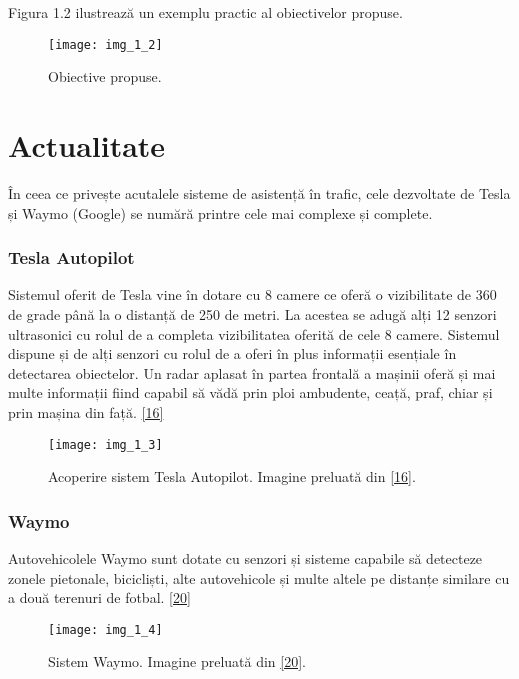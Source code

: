Figura 1.2 ilustrează un exemplu practic al obiectivelor propuse.
\begin{figure}[!h]
	\centering
	\texttt{[image: img\_1\_2]}
	\caption{Obiective propuse.}
\end{figure} 

\section{Actualitate}

În ceea ce privește acutalele sisteme de asistență în trafic, cele dezvoltate de Tesla și Waymo (Google) se numără printre cele mai complexe și complete.

\subsubsection{Tesla Autopilot}

Sistemul oferit de Tesla vine în dotare cu 8 camere ce oferă o vizibilitate de 360 de grade până la o distanță de 250 de metri. La acestea se adugă alți 12 senzori ultrasonici cu rolul de a completa vizibilitatea oferită de cele 8 camere. Sistemul dispune și de alți senzori cu rolul de a oferi în plus informații esențiale în detectarea obiectelor. Un radar aplasat în partea frontală a mașinii oferă și mai multe informații fiind capabil să vădă prin ploi ambudente, ceață, praf, chiar și prin mașina din față. \hyperlink{TeslaAutopilotSystem}{[16]}

\begin{figure}[!h]
	\centering
	\texttt{[image: img\_1\_3]}
	\caption[Acoperire sistem Tesla Autopilot]{Acoperire sistem Tesla Autopilot. Imagine preluată din \hyperlink{TeslaAutopilotSystem}{[16]}.}
\end{figure} 

\subsubsection{Waymo}

Autovehicolele Waymo sunt dotate cu senzori și sisteme capabile să detecteze zonele pietonale, bicicliști, alte autovehicole și multe altele pe distanțe similare cu a două terenuri de fotbal. \hyperlink{WaymoSystem}{[20]}

\begin{figure}[!h]
	\centering
	\texttt{[image: img\_1\_4]}
	\caption[Sistem Waymo]{Sistem Waymo. Imagine preluată din \hyperlink{WaymoSystem}{[20]}.}
\end{figure} 

